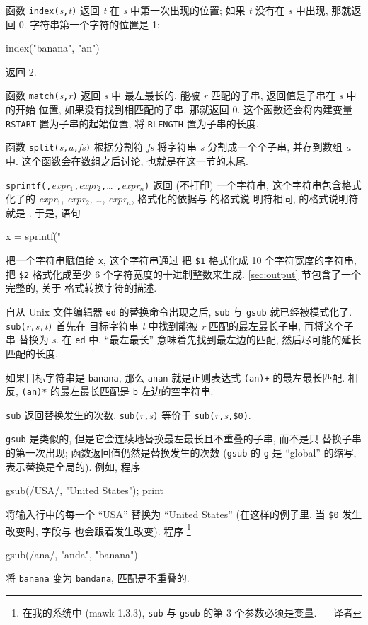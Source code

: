 函数 \verb'index('\textit{s}\verb','\textit{t}\verb')' 返回 \textit{t} 在
\textit{s} 中第一次出现的位置; 如果 \textit{t} 没有在 \textit{s} 中出现,
那就返回 0. 字符串第一个字符的位置是 1:
\begin{awkcode}
    index("banana", "an")
\end{awkcode}
返回 2.

函数 \verb'match('\textit{s}\verb','\textit{r}\verb')' 返回 \textit{s} 中
最左最长的, 能被 \textit{r} 匹配的子串, 返回值是子串在 \textit{s} 中的开始
位置, 如果没有找到相匹配的子串, 那就返回 0. 这个函数还会将内建变量
\verb'RSTART' 置为子串的起始位置, 将 \verb'RLENGTH' 置为子串的长度.

函数 \verb'split('\textit{s}\verb','\textit{a}\verb','\textit{fs}\verb')'
根据分割符 \textit{fs} 将字符串 \textit{s} 分割成一个个子串, 并存到数组
\textit{a} 中. 这个函数会在数组之后讨论, 也就是在这一节的末尾.

\verb'sprintf('\fmt\verb','\textit{expr}$_1$\verb','\textit{expr}$_2$\verb','\ldots%
\verb','\textit{expr}$_n$\verb')' 返回 (不打印) 一个字符串,
这个字符串包含格式%
化了的
\textit{expr}$_1$, \textit{expr}$_2$, \ldots, \textit{expr}$_n$,
格式化的依据与 \printf 的格式说
明符相同, \printf 的格式说明符就是 \fmt. 于是, 语句
\begin{awkcode}
    x = sprintf("%
\end{awkcode}
把一个字符串赋值给 \verb'x', 这个字符串通过%
把 \verb'$1' 格式化成 10 个字符宽度的字符串, 把 \verb'$2' 格式化成至少 6
个字符宽度的十进制整数来生成. \ref{sec:output} 节包含了一个完整的, 关于
格式转换字符的描述.

自从 Unix 文件编辑器 \verb'ed' 的替换命令出现之后, \verb'sub' 与
\verb'gsub' 就已经被模式化了.
\verb'sub('\textit{r}\verb','\textit{s}\verb','\textit{t}\verb')' 首先在
目标字符串 \textit{t} 中找到能被 \textit{r} 匹配的最左最长子串,
再将这个子串
替换为 \textit{s}. 在 \verb'ed' 中, ``最左最长'' 意味着先找到最左边的匹配,
然后尽可能的延长匹配的长度.

如果目标字符串是 \verb'banana', 那么 \verb'anan' 就是正则表达式
\verb'(an)+' 的最左最长匹配. 相反, \verb'(an)*' 的最左最长匹配是 \verb'b'
左边的空字符串.

\verb'sub' 返回替换发生的次数.
\verb'sub('\textit{r}\verb','\textit{s}\verb')' 等价于
\verb'sub('\textit{r}\verb','\textit{s}\verb','\verb'$0'\verb')'.

\verb'gsub' 是类似的, 但是它会连续地替换最左最长且不重叠的子串, 而不是只
替换子串的第一次出现; 函数返回值仍然是替换发生的次数
(\verb'gsub' 的 \verb'g' 是 ``global'' 的缩写, 表示替换是全局的). 例如,
程序
\begin{awkcode}
    { gsub(/USA/, "United States"); print }
\end{awkcode}
将输入行中的每一个 ``USA'' 替换为 ``United States'' (在这样的例子里,
当 \verb'$0' 发生改变时, 字段与 \nf 也会跟着发生改变). 程序
\footnote{在我的系统中 (mawk-1.3.3), \texttt{sub} 与 \texttt{gsub}
的第 3 个参数必须是变量. --- 译者}
\begin{awkcode}
    gsub(/ana/, "anda", "banana")
\end{awkcode}
将 \verb'banana' 变为 \verb'bandana', 匹配是不重叠的.


